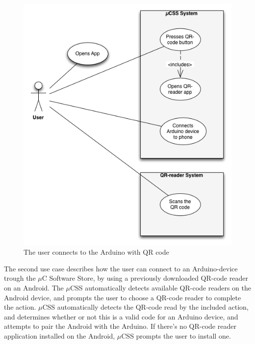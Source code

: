 \begin{figure}[H]
\centering
\includegraphics[scale=0.7]{images/UseCase2}
\caption[Use case 2]{The user connects to the Arduino with QR code}
\end{figure}

The second use case describes how the user can connect to an Arduino-device trough the $\mu$C Software Store, by using a previously downloaded QR-code reader on an Android. The $\mu$CSS automatically detects available QR-code readers on the Android device, and prompts the user to choose a QR-code reader to complete the action. $\mu$CSS automatically detects the QR-code read by the included action, and determines whether or not this is a valid code for an Arduino device, and attempts to pair the Android with the Arduino. If there's no QR-code reader application installed on the Android, $\mu$CSS prompts the user to install one.

